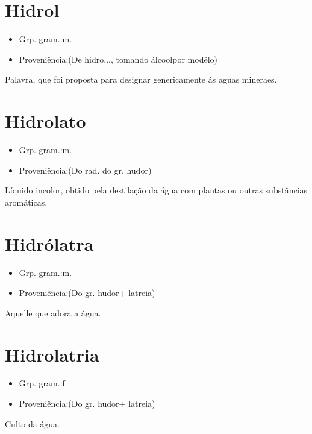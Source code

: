 \documentclass{article}
\begin{document}
\section{Hidrol}
\begin{itemize}
\item {Grp. gram.:m.}
\end{itemize}
\begin{itemize}
\item {Proveniência:(De \textunderscore hidro...\textunderscore , tomando \textunderscore álcool\textunderscore  por modêlo)}
\end{itemize}
Palavra, que foi proposta para designar genericamente ás aguas mineraes.
\section{Hidrolato}
\begin{itemize}
\item {Grp. gram.:m.}
\end{itemize}
\begin{itemize}
\item {Proveniência:(Do rad. do gr. \textunderscore hudor\textunderscore )}
\end{itemize}
Líquido incolor, obtido pela destilação da água com plantas ou outras substâncias aromáticas.
\section{Hidrólatra}
\begin{itemize}
\item {Grp. gram.:m.}
\end{itemize}
\begin{itemize}
\item {Proveniência:(Do gr. \textunderscore hudor\textunderscore  + \textunderscore latreia\textunderscore )}
\end{itemize}
Aquelle que adora a água.
\section{Hidrolatria}
\begin{itemize}
\item {Grp. gram.:f.}
\end{itemize}
\begin{itemize}
\item {Proveniência:(Do gr. \textunderscore hudor\textunderscore  + \textunderscore latreia\textunderscore )}
\end{itemize}
Culto da água.
\end{document}
